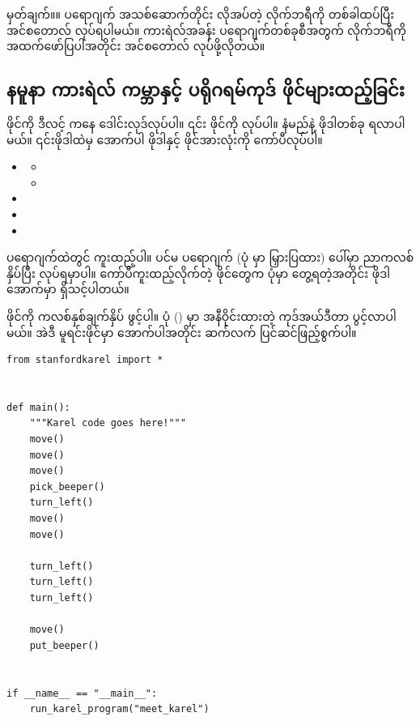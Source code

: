 \begin{mytcbox}
\noindent\qquad မှတ်ချက်။\qquad ။ ပရောဂျက် အသစ်ဆောက်တိုင်း လိုအပ်တဲ့ လိုက်ဘရီကို တစ်ခါထပ်ပြီး အင်စတောလ် လုပ်ရပါမယ်။ ကားရဲလ်အခန်း ပရောဂျက်တစ်ခုစီအတွက်  လိုက်ဘရီကို အထက်ဖော်ပြပါအတိုင်း အင်စတောလ် လုပ်ဖို့လိုတယ်။
\end{mytcbox}

\clearpage
\subsection*{နမူနာ ကားရဲလ် ကမ္ဘာနှင့် ပရိုဂရမ်ကုဒ် ဖိုင်များထည့်ခြင်း}
 ဖိုင်ကို  ဒီလင့်  ကနေ ဒေါင်းလုဒ်လုပ်ပါ။ ၎င်း  ဖိုင်ကို  လုပ်ပါ။  နံမည်နဲ့ ဖိုဒါတစ်ခု ရလာပါမယ်။ ၎င်းဖိုဒါထဲမှ အောက်ပါ  ဖိုဒါနှင့်  ဖိုင်အားလုံးကို ကော်ပီလုပ်ပါ။ 
%
\begin{itemize}
    \item {} 
    \begin{itemize}
        \item {}
        \item {}
    \end{itemize}
    \item {}
    \item {}
    \item {}
\end{itemize}
%


 ပရောဂျက်ထဲတွင် ကူးထည့်ပါ။ ပင်မ ပရောဂျက်  (ပုံ \fRefNo{\ref{fig:edit_meet_karel}} မှာ မြှားပြထား) ပေါ်မှာ ညာကလစ်နှိပ်ပြီး  လုပ်ရမှာပါ။ ကော်ပီကူးထည့်လိုက်တဲ့ ဖိုင်တွေက ပုံမှာ တွေ့ရတဲ့အတိုင်း   ဖိုဒါအောက်မှာ ရှိသင့်ပါတယ်။

 ဖိုင်ကို ကလစ်နှစ်ချက်နှိပ် ဖွင့်ပါ။ ပုံ (\fRefNo{\ref{fig:edit_meet_karel}}) မှာ အနီဝိုင်းထားတဲ့  ကုဒ်အယ်ဒီတာ  ပွင့်လာပါမယ်။ အဲဒီ မူရင်းဖိုင်မှာ အောက်ပါအတိုင်း ဆက်လက် ပြင်ဆင်ဖြည့်စွက်ပါ။
%
\setlength{\fboxsep}{0pt}
\begin{verbatim}
from stanfordkarel import *


def main():
    """Karel code goes here!"""
    move()
    move()
    move()
    pick_beeper()
    turn_left()
    move()
    move()

    turn_left()
    turn_left()
    turn_left()

    move()
    put_beeper()


if __name__ == "__main__":
    run_karel_program("meet_karel")
\end{verbatim}
%

